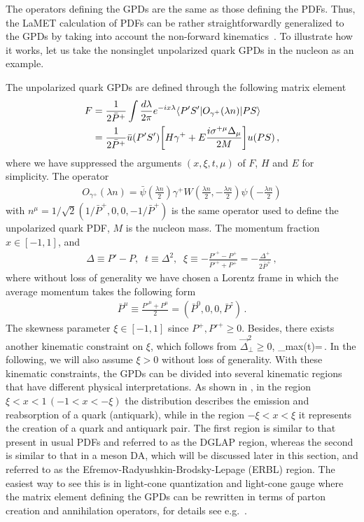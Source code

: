 The operators defining the GPDs are the same as those defining the PDFs. Thus, the LaMET calculation of PDFs can be rather straightforwardly generalized to the GPDs by taking into account the non-forward kinematics~\cite{Liu:2018tox}. To illustrate how it works, let us take the nonsinglet unpolarized quark GPDs in the nucleon as an example.


The unpolarized quark GPDs are defined through the following matrix element~\cite{Ji:2004gf}
\begin{align}\label{eq:GPD}
	F&=\frac{1}{2{\bar P}^+}\int \frac{d\lambda}{2\pi}e^{-i x\lambda}\langle P'S'|O_{\gamma^+}(\lambda n)|PS\rangle\nonumber\\
	&=\frac{1}{2{\bar P}^+}\bar{u}(P'S')\bigg[H\gamma^+
	+E\frac{i\sigma^{+\mu}\Delta_\mu}{2M}\bigg]u(PS)\,,
\end{align}
where we have suppressed the arguments $(x,\xi,t, \mu)$ of $F$, $H$ and $E$ for simplicity. The operator
\begin{align}
	O_{\gamma^+}(\lambda n)=\bar\psi(\frac{\lambda n} 2)\gamma^+ W(\frac{\lambda n}{2},-\frac{\lambda n}{2})\psi(-\frac{\lambda n} 2)
\end{align}
with $n^\mu=1/\sqrt 2(1/{\bar P}^+, 0,0, -1/{\bar P}^+)$ is the same operator used to define the unpolarized quark PDF, $M$ is the nucleon mass.
%
The momentum fraction $x\in [-1,1]$, and
\begin{align}\label{eq:kinematic_variable}
	\Delta\equiv P'-P,\;\; t\equiv \Delta^2,\;\; \xi\equiv -\frac{P'^+-P^+}{P'^++P^+}=-\frac{\Delta^+}{2{\bar P}^+}\,,
\end{align}
where without loss of generality we have chosen a Lorentz frame in which the average momentum takes the following form
\begin{align}
	{\bar P}^\mu\equiv\frac{P'^\mu+P^\mu}{2}=({\bar P}^0,0,0,{\bar P}^z)\,.
\end{align}
The skewness parameter $\xi\in[-1,1]$ since $P^+, P'^+\ge0$. Besides, there exists another kinematic constraint on $\xi$, which follows from $\vec \Delta^2_\perp\ge 0$,
\beq\label{eq:sklimit}
\xi\le\xi_{\rm max}(t)=\,.
\eeq
In the following, we will also assume $\xi>0$ without loss of generality. With these kinematic constraints, the GPDs can be divided into several kinematic regions that have different physical interpretations. As shown in , in the region $\xi<x<1\, (-1<x<-\xi)$ the distribution describes the emission and reabsorption of a quark (antiquark), while in the region $-\xi<x<\xi$ it represents the creation of a quark and antiquark pair. The first region is similar to that present in usual PDFs and referred to as the DGLAP region, whereas the second is similar to that in a meson DA, which will be discussed later in this section, and referred to as the Efremov-Radyushkin-Brodsky-Lepage (ERBL) region. The easiest way to see this is in light-cone quantization and light-cone gauge where the matrix element defining the GPDs can be rewritten in terms of parton creation and annihilation operators, for details see e.g.~\cite{Ji:2004gf}.

